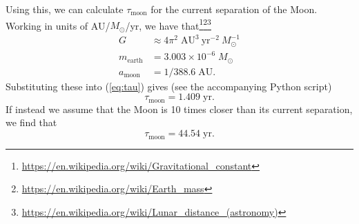 \documentclass[11pt]{article}
\begin{document}
Using this, we can calculate $\tau_{\mathrm{moon}}$ for the current separation of the Moon. Working in units of AU/$M_\odot$/yr, we have that\footnote{\url{https://en.wikipedia.org/wiki/Gravitational\_constant}}\footnote{\url{https://en.wikipedia.org/wiki/Earth\_mass}}\footnote{\url{https://en.wikipedia.org/wiki/Lunar\_distance\_(astronomy)}}
\begin{align*}
    G &\approx 4 \pi^2 \; \mathrm{AU}^3 \: \mathrm{yr}^{-2} \: M_\odot^{-1} \\
    m_{\mathrm{earth}} &= 3.003 \times 10^{-6} \; M_\odot \\
    a_{\mathrm{moon}} &= 1/388.6 \; \mathrm{AU}.
\end{align*}
Substituting these into (\ref{eq:tau}) gives (see the accompanying Python script)
\[
    \tau_{\mathrm{moon}} = 1.409 \; \mathrm{yr}.
\]
If instead we assume that the Moon is 10 times closer than its current separation, we find that
\[
    \tau_{\mathrm{moon}} = 44.54 \; \mathrm{yr}.
\]
\end{document}
